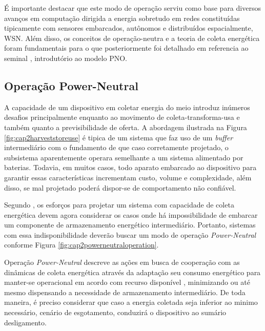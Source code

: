 É importante destacar que este modo de operação serviu como base para diversos avanços em computação dirigida a energia sobretudo em redes constituídas tipicamente com sensores embarcados, autônomos e distribuídos espacialmente, \acf{WSN}. Além disso, os conceitos de operação-neutra e a teoria de coleta energética foram fundamentais para o que posteriormente foi detalhado em referencia ao seminal \cite{merrett_energy-driven_2017}, introdutório ao modelo \acf{PNO}.



\subsection{Operação Power-Neutral}
A capacidade de um dispositivo em coletar energia do meio introduz inúmeros desafios principalmente enquanto ao movimento de coleta-transforma-usa e também quanto a previsibilidade de oferta. A abordagem ilustrada na Figura \ref{fig:cap2harveststoreuse} é tipica de um sistema que faz uso de um \textit{buffer} intermediário com o fundamento de que caso corretamente projetado, o subsistema aparentemente operara semelhante a um sistema alimentado por baterias. Todavia, em muitos casos, todo aparato embarcado ao dispositivo para garantir essas características incrementam custo, volume e complexidade, além disso, se mal projetado poderá dispor-se de comportamento não confiável.

Segundo \cite{merrett_energy-driven_2017}, os esforços para projetar um sistema com capacidade de coleta energética devem agora considerar os casos onde há impossibilidade de embarcar um componente de armazenamento energético intermediário. Portanto, sistemas com essa indisponibilidade deverão buscar um modo de operação \textit{Power-Neutral} conforme Figura \ref{fig:cap2powerneutraloperation}.

Operação \textit{Power-Neutral} descreve as ações em busca de cooperação com as dinâmicas de coleta energética através da adaptação seu consumo energético para manter-se operacional em acordo com recurso disponível \cite{sliper_energy-driven_2020}, minimizando ou até mesmo dispensando a necessidade de armazenamento intermediário. De toda maneira, é preciso considerar que caso a energia coletada seja inferior ao minimo necessário, cenário de esgotamento, conduzirá o dispositivo ao sumário desligamento.


